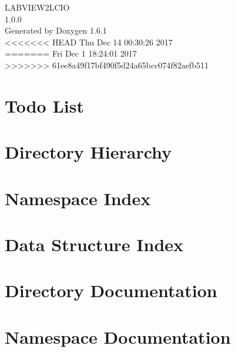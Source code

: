 \documentclass[a4paper]{book}
\begin{document}
\begin{titlepage}
\vspace*{7cm}
\begin{center}
{\Large LABVIEW2LCIO \\[1ex]\large 1.0.0 }\\
\vspace*{1cm}
{\large Generated by Doxygen 1.6.1}\\
\vspace*{0.5cm}
<<<<<<< HEAD
{\small Thu Dec 14 00:30:26 2017}\\
=======
{\small Fri Dec 1 18:24:01 2017}\\
>>>>>>> 61ee8a49f17bf490f5d24a65bcc074f82aefb511
\end{center}
\end{titlepage}
\clearemptydoublepage
{}
\tableofcontents
\clearemptydoublepage
{}
\chapter{Todo List}
\label{todo}

\chapter{Directory Hierarchy}

\chapter{Namespace Index}

\chapter{Data Structure Index}

\chapter{Directory Documentation}




\chapter{Namespace Documentation}

\end{document}
